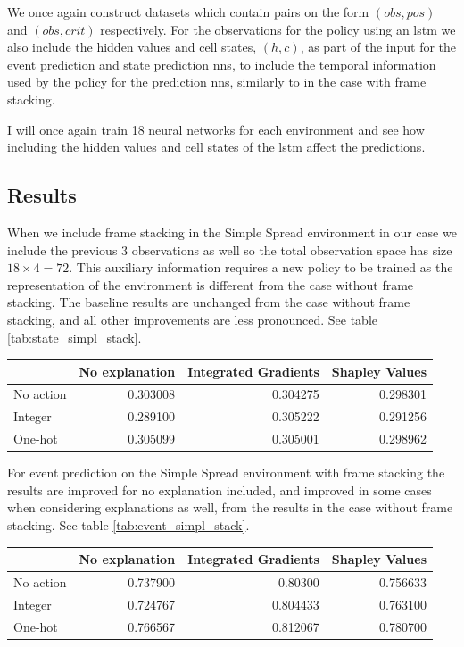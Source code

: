\documentclass[UKenglish]{uiomasterthesis}
\begin{document}
We once again construct datasets which contain pairs on the form $(obs, pos)$ and $(obs, crit)$ respectively. For the observations for the policy using an \ac{lstm} we also include the hidden values and cell states, $(h,c)$, as part of the input for the event prediction and state prediction \acp{nn}, to include the temporal information used by the policy for the prediction \acp{nn}, similarly to in the case with frame stacking.

I will once again train 18 neural networks for each environment and see how including the hidden values and cell states of the \ac{lstm} affect the predictions.

\subsection{Results}
When we include frame stacking in the Simple Spread environment in our case we include the previous 3 observations as well so the total observation space has size $18\times 4 = 72$. This auxiliary information requires a new policy to be trained as the representation of the environment is different from the case without frame stacking. The baseline results are unchanged from the case without frame stacking, and all other improvements are less pronounced. See table \ref{tab:state_simpl_stack}.

\begin{center}
\label{tab:state_simpl_stack}
\begin{tabular}{lrrr}
\toprule
 & No explanation & Integrated Gradients & Shapley Values \\
\midrule
No action & 0.303008 & 0.304275 & 0.298301 \\
Integer & 0.289100 & 0.305222 & 0.291256 \\
One-hot & 0.305099 & 0.305001 & 0.298962 \\
\bottomrule
\end{tabular}
\end{center}

For event prediction on the Simple Spread environment with frame stacking the results are improved for no explanation included, and improved in some cases when considering explanations as well, from the results in the case without frame stacking. See table \ref{tab:event_simpl_stack}.


\begin{center}
\label{tab:event_simpl_stack}
\begin{tabular}{lrrr}
\toprule
 & No explanation & Integrated Gradients & Shapley Values \\
\midrule
No action & 0.737900 & 0.80300 & 0.756633 \\
Integer & 0.724767 & 0.804433 & 0.763100 \\
One-hot & 0.766567 & 0.812067 & 0.780700 \\
\bottomrule
\end{tabular}
\end{center}
\end{document}
